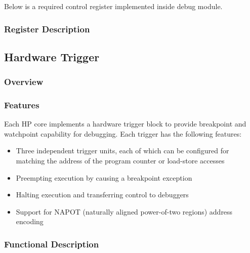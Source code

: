\documentclass[main\_\_EN.tex]{subfiles}
\begin{document}
Below is a required control register implemented inside debug module.




\subsubsection{Register Description}
\label{sec:riscvcpu-cti-reg-desc}



\newpage
\subsection{Hardware Trigger}
\label{sec:riscvcpu-hwt}

\subsubsection{Overview}
\label{sec:riscvcpu-hwt-overview}

\subsubsection{Features}
\label{sec:riscvcpu-hwt-features}

Each HP core implements a hardware trigger block to provide breakpoint and watchpoint capability for debugging. Each trigger has the following features:

\begin{itemize}
    \item Three independent trigger units, each of which can be configured for matching the address of the program counter or load-store accesses
    \item Preempting execution by causing a breakpoint exception
    \item Halting execution and transferring control to debuggers
    \item Support for NAPOT (naturally aligned power-of-two regions) address encoding
\end{itemize}

\subsubsection{Functional Description}
\label{sec:riscvcpu-hwt-func-descr}
\end{document}
